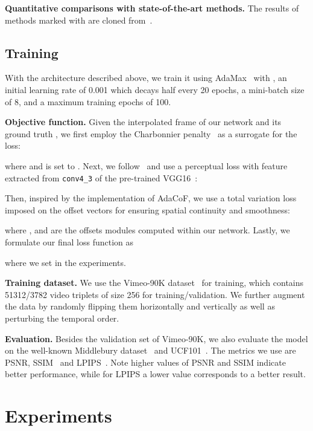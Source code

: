 \documentclass[final]{cvpr}
\newcommand{\myparagraph}[1]{\textbf{#1}}
\begin{document}
\begin{table*}[!ht]
\vspace{-.12in}
\caption{\textbf{Quantitative comparisons with state-of-the-art methods.} The results of methods marked with  are cloned from~\cite{niklaus2020softmax}.}
\label{tab:quant}
\vspace{-.2in}
\end{table*}


\subsection{Training} \label{sec:training}

With the architecture described above, we train it using AdaMax~\cite{kingma2014adam} with , an initial learning rate of 0.001 which decays half every 20 epochs, a mini-batch size of 8, and a maximum training epochs of 100.

\myparagraph{Objective function.} Given the interpolated frame  of our network and its ground truth , we first employ the Charbonnier penalty~\cite{liu2017video} as a surrogate for the  loss:

where  and  is set to . Next, we follow~\cite{lee2020adacof} and use a perceptual loss with feature  extracted from  \texttt{conv4\_3} of the pre-trained VGG16~\cite{simonyan2014very}:

Then, inspired by the implementation of AdaCoF, we use a total variation loss imposed on the offset vectors for ensuring spatial continuity and smoothness:

where , and  are the offsets modules computed within our network. Lastly, we formulate our final loss function as

where we set  in the experiments.

\myparagraph{Training dataset.} We use the Vimeo-90K dataset~\cite{xue2019video} for training, which contains 51312/3782 video triplets of size 256 for training/validation. We further augment the data by randomly flipping them horizontally and vertically as well as perturbing the temporal order.

\myparagraph{Evaluation.} Besides the validation set of Vimeo-90K, we also evaluate the model on the well-known Middlebury dataset~\cite{baker2011database} and UCF101~\cite{liu2017video,soomro2012ucf101}. The metrics we use are PSNR, SSIM~\cite{wang2004image} and LPIPS~\cite{zhang2018unreasonable}. Note higher values of PSNR and SSIM indicate better performance, while for LPIPS a lower value corresponds to a better result.

\section{Experiments} \label{sec:exp}
\end{document}
